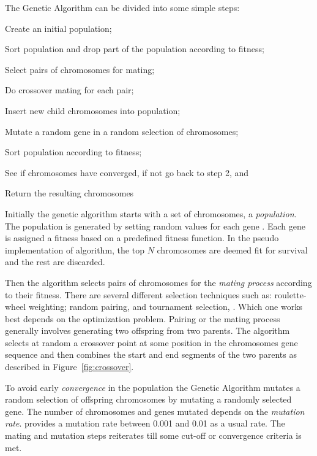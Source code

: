 The Genetic Algorithm can be divided into some simple steps:
\begin{inparaenum}[\itshape 1\upshape)]
\item Create an initial population;
\item Sort population and drop part of the population according to fitness;
\item Select pairs of chromosomes for mating;
\item Do crossover mating for each pair;
\item Insert new child chromosomes into population;
\item Mutate a random gene in a random selection of chromosomes;
\item Sort population according to fitness;
\item See if chromosomes have converged, if not go back to step 2, and
\item Return the resulting chromosomes
\end{inparaenum}

Initially the genetic algorithm starts with a set of chromosomes, a \textit{population}. The population is generated by setting random values for each gene \cite{Haupt2004a,Negnevitsky2002,Goldberg1989}. Each gene is assigned a fitness based on a predefined fitness function. In the pseudo implementation of \citeauthor{Haupt2004a} algorithm, the top \(N\) chromosomes are deemed fit for survival and the rest are discarded.

Then the algorithm selects pairs of chromosomes for the \textit{mating process} according to their fitness. There are several different selection techniques such as: roulette-wheel weighting; random pairing, and tournament selection, \cite{Haupt2004a}. Which one works best depends on the optimization problem. Pairing or the mating process generally involves generating two offspring from two parents. The algorithm selects at random a crossover point at some position in the chromosomes gene sequence and then combines the start and end segments of the two parents as described in Figure~\ref{fig:crossover}.

To avoid early \textit{convergence} in the population the Genetic Algorithm mutates a random selection of offspring chromosomes by mutating a randomly selected gene. The number of chromosomes and genes mutated depends on the \textit{mutation rate}. \cite{Goldberg1989,Negnevitsky2002} provides a mutation rate between 0.001 and 0.01 as a usual rate. The mating and mutation steps reiterates till some cut-off or convergence criteria is met.

